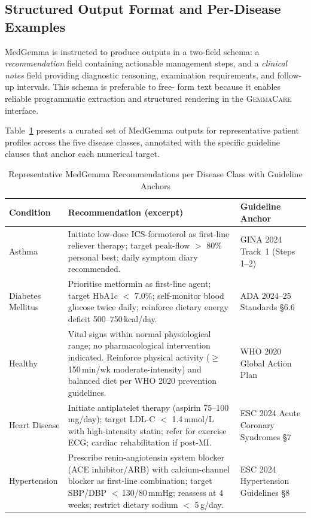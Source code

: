 \documentclass[journal]{IEEEtran}
\newcommand{\GC}{\textsc{GemmaCare}}
\begin{document}
\subsection{Structured Output Format and Per-Disease Examples}

MedGemma is instructed to produce outputs in a two-field schema: a
\textit{recommendation} field containing actionable management steps, and
a \textit{clinical notes} field providing diagnostic reasoning, examination
requirements, and follow-up intervals. This schema is preferable to free-
form text because it enables reliable programmatic extraction and structured
rendering in the \GC{} interface.

Table~\ref{tab:medgemma_examples} presents a curated set of MedGemma outputs
for representative patient profiles across the five disease classes, annotated
with the specific guideline clauses that anchor each numerical target.

\begin{table}[!t]
  \centering
  \caption{Representative MedGemma Recommendations per Disease Class with Guideline Anchors}
  \label{tab:medgemma_examples}
  \renewcommand{\arraystretch}{1.25}
  \begin{tabularx}{\textwidth}{lXX}
    \toprule
    \textbf{Condition} & \textbf{Recommendation (excerpt)} & \textbf{Guideline Anchor} \\
    \midrule
    Asthma &
      Initiate low-dose ICS-formoterol as first-line reliever therapy;
      target peak-flow $>$ 80\% personal best; daily symptom diary recommended. &
      GINA 2024 Track~1 (Steps 1--2) \\
    \addlinespace
    Diabetes Mellitus &
      Prioritise metformin as first-line agent; target HbA1c $<$ 7.0\%;
      self-monitor blood glucose twice daily; reinforce dietary energy deficit
      500--750\,kcal/day. &
      ADA 2024--25 Standards \S6.6 \\
    \addlinespace
    Healthy &
      Vital signs within normal physiological range; no pharmacological
      intervention indicated. Reinforce physical activity ($\geq$ 150\,min/wk
      moderate-intensity) and balanced diet per WHO 2020 prevention guidelines. &
      WHO 2020 Global Action Plan \\
    \addlinespace
    Heart Disease &
      Initiate antiplatelet therapy (aspirin 75--100\,mg/day); target LDL-C
      $<$ 1.4\,mmol/L with high-intensity statin; refer for exercise ECG;
      cardiac rehabilitation if post-MI. &
      ESC 2024 Acute Coronary Syndromes \S7 \\
    \addlinespace
    Hypertension &
      Prescribe renin-angiotensin system blocker (ACE inhibitor/ARB) with
      calcium-channel blocker as first-line combination; target SBP/DBP
      $<$\,130/80\,mmHg; reassess at 4 weeks; restrict dietary sodium
      $<$ 5\,g/day. &
      ESC 2024 Hypertension Guidelines \S8 \\
    \bottomrule
  \end{tabularx}
\end{table}
\end{document}
